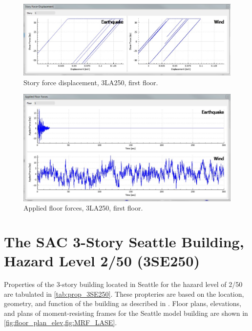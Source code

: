 \documentclass{simcenterdocumentation}
\begin{document}
\begin{figure}[H]
	\centering \includegraphics[scale=0.35]{3LA250_sfd.JPG}
	\caption{Story force displacement, 3LA250, first floor.}
\end{figure}
\begin{figure}[H]
	\centering \includegraphics[scale=0.35]{3LA250_aff.JPG}
	\caption{Applied floor forces, 3LA250, first floor.}
\end{figure}





\section{The SAC 3-Story Seattle Building, Hazard Level 2/50 (3SE250)}
Properties of the 3-story building located in Seattle for the hazard level of 2/50 are tabulated in \cref{tab:prop_3SE250}. These propteries are based on the location, geometry, and function of the building as described in \cite{FEMA335c2000}. Floor plans, elevations, and plans of moment-resisting frames for the Seattle model building are shown in \cref{fig:floor_plan_elev,fig:MRF_LASE}.
\end{document}
